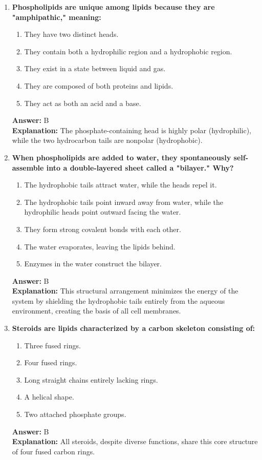 \documentclass[11pt, a4paper]{article}
\begin{document}
\begin{enumerate}
\item \textbf{Phospholipids are unique among lipids because they are "amphipathic," meaning:}
\begin{enumerate}[label=\Alph*.]
    \item They have two distinct heads.
    \item They contain both a hydrophilic region and a hydrophobic region.
    \item They exist in a state between liquid and gas.
    \item They are composed of both proteins and lipids.
    \item They act as both an acid and a base.
\end{enumerate}
\textbf{Answer:} B \\
\textbf{Explanation:} The phosphate-containing head is highly polar (hydrophilic), while the two hydrocarbon tails are nonpolar (hydrophobic).

\item \textbf{When phospholipids are added to water, they spontaneously self-assemble into a double-layered sheet called a "bilayer." Why?}
\begin{enumerate}[label=\Alph*.]
    \item The hydrophobic tails attract water, while the heads repel it.
    \item The hydrophobic tails point inward away from water, while the hydrophilic heads point outward facing the water.
    \item They form strong covalent bonds with each other.
    \item The water evaporates, leaving the lipids behind.
    \item Enzymes in the water construct the bilayer.
\end{enumerate}
\textbf{Answer:} B \\
\textbf{Explanation:} This structural arrangement minimizes the energy of the system by shielding the hydrophobic tails entirely from the aqueous environment, creating the basis of all cell membranes.

\item \textbf{Steroids are lipids characterized by a carbon skeleton consisting of:}
\begin{enumerate}[label=\Alph*.]
    \item Three fused rings.
    \item Four fused rings.
    \item Long straight chains entirely lacking rings.
    \item A helical shape.
    \item Two attached phosphate groups.
\end{enumerate}
\textbf{Answer:} B \\
\textbf{Explanation:} All steroids, despite diverse functions, share this core structure of four fused carbon rings.


\end{enumerate}
\end{document}
